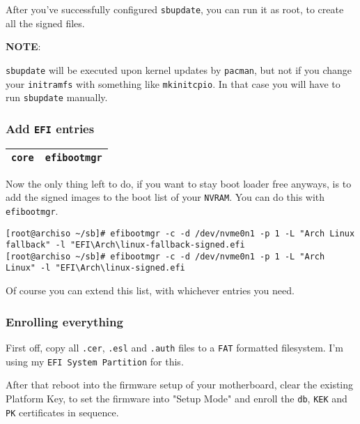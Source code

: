 \documentclass[9pt]{report}
\newcommand{\admonition}[2]{\textbf{#1}: {#2}}
\begin{document}
After you’ve successfully configured \texttt{sbupdate}, you can run it as root, to create all the signed files.


\admonition{NOTE}{\texttt{sbupdate} will be executed upon kernel updates by \texttt{pacman}, but not if you change your \texttt{initramfs} with something like \texttt{mkinitcpio}.
In that case you will have to run \texttt{sbupdate} manually.

}

\vfill\eject

\hypertarget{x-add-efi-entries}{\subsubsection{Add \texttt{EFI} entries}}
\begin{center}
\begin{tabular}{|c|c|}
\hline
\texttt{core} & \texttt{efibootmgr} \\ 
\hline
\end{tabular}
\end{center}

Now the only thing left to do, if you want to stay boot loader free anyways, is to add the signed images to the boot list of your \texttt{NVRAM}.
You can do this with \texttt{efibootmgr}.


\begin{verbatim}
[root@archiso ~/sb]# efibootmgr -c -d /dev/nvme0n1 -p 1 -L "Arch Linux fallback" -l "EFI\Arch\linux-fallback-signed.efi
[root@archiso ~/sb]# efibootmgr -c -d /dev/nvme0n1 -p 1 -L "Arch Linux" -l "EFI\Arch\linux-signed.efi
\end{verbatim}

Of course you can extend this list, with whichever entries you need.



\vfill\eject

\hypertarget{x-enrolling-everything}{\subsubsection{Enrolling everything}}
First off, copy all \texttt{.cer}, \texttt{.esl} and \texttt{.auth} files to a \texttt{FAT} formatted filesystem.
I’m using my \texttt{EFI System Partition} for this.


After that reboot into the firmware setup of your motherboard, clear the existing Platform Key, to set the firmware into "Setup Mode" and enroll the \texttt{db}, \texttt{KEK} and \texttt{PK} certificates in sequence.
\end{document}

